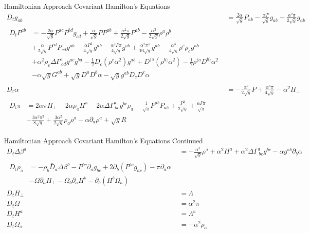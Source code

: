 \documentclass[xcolor=dvipsnames]{beamer}
\begin{document}
	\begin{frame}{Hamiltonian Approach}
		Covariant Hamilton's Equations
		\small
		\begin{align*}
		D_{t}g_{ab} & = \frac{2\alpha}{\sqrt{g}}P_{ab} - \frac{\alpha P}{\sqrt{g}}g_{ab} - \frac{\alpha^{2}\pi}{2\sqrt{g}}g_{ab}\\
		\begin{split}
		D_{t} P^{ab} & = - \frac{2\alpha}{\sqrt{g}}P^{ac}P^{bd}g_{cd} + \frac{\alpha}{\sqrt{g}}PP^{ab} + \frac{\alpha^{2}\pi}{2\sqrt{g}
		}P^{ab} - \frac{\alpha^{3}}{2\sqrt{g}}\rho^{a}\rho^{b}\\
		& + \frac{\alpha}{2\sqrt{g}}P^{cd}P_{cd}g^{ab} - \frac{\alpha P^{2}}{4\sqrt{g}}g^{ab} - \frac{\alpha^{2}P\pi}{4\sqrt{g}}g^{ab} + \frac{\alpha^{2}\pi^{3}}{16\sqrt{g}}g^{ab} - \frac{\alpha^{3}}{4\sqrt{g}}\rho^{c}\rho_{c}g^{ab}\\
		& + \alpha^{2}\rho_{e}\Delta \Gamma^{e}_{~cd}g^{ac}g^{bd} - \frac{1}{2}D_{c}\left(\rho^{c}\alpha^{2}\right)g^{ab} + D^{(a}\left(\rho^{b)}\alpha^{2}\right) - \frac{1}{2}\rho^{(a}D^{b)}\alpha^{2}\\
		& - \alpha \sqrt{g}G^{ab} + \sqrt{g}D^{a}D^{b}\alpha - \sqrt{g}g^{ab}D_{c}D^{c}\alpha
		\end{split}\\
		D_{t}\alpha & = - \frac{\alpha^{2}}{2\sqrt{g}}P + \frac{\alpha^{3}\pi}{4\sqrt{g}} - \alpha^{2}H_{\perp}\\
		\begin{split}
		D_{t}\pi & = 2\alpha\pi H_{\perp} - 2\alpha \rho_{a}H^{a} - 2\alpha\Delta \Gamma^{a}_{~bc}g^{bc}\rho_{a} - \frac{1}{\sqrt{g}}P^{ab}P_{ab} + \frac{P^{2}}{2\sqrt{g}} + \frac{\alpha P \pi}{\sqrt{g}}\\
		& - \frac{3\alpha^{2}\pi^{2}}{8\sqrt{g}} + \frac{3\alpha^{2}}{2\sqrt{g}}\rho_{a}\rho^{a} - \alpha \partial_{a}\rho^{a} + \sqrt{g}R
		\end{split}
	\end{align*}
	\end{frame}
	\begin{frame}{Hamiltonian Approach}
		Covariant Hamilton's Equations \tiny{Continued}
		\small
		\begin{align*}
		D_{t}\Delta \beta^{a} & = - \frac{\alpha^{3}}{\sqrt{g}}\rho^{a} + \alpha^{2}H^{a} + \alpha^{2}\Delta \Gamma^{a}_{~bc}g^{bc} - \alpha g^{ab}\partial_{b}\alpha\\
		\begin{split}
		D_{t}\rho_{a} & = - \rho_{b}{\bar D}_{a}\Delta\beta^{b} - P^{bc}\partial_{a}g_{bc} + 2\partial_{b}\left(P^{bc}g_{ac}\right) - \pi \partial_{a}\alpha\\
		& - \Omega \partial_{a}H_{\perp} - \Omega_{b}\partial_{a}H^{b} - \partial_{b}\left(H^{b} \Omega_{a}\right)
		\end{split}\\
		D_{t}H_{\perp} & = \Lambda\\
		D_{t}\Omega & = \alpha^{2}\pi \\
		D_{t}H^{a} & = \Lambda^{a}\\
		D_{t}\Omega_{a} & = -\alpha^{2}\rho_{a}
		\end{align*}
	\end{frame}
\end{document}

